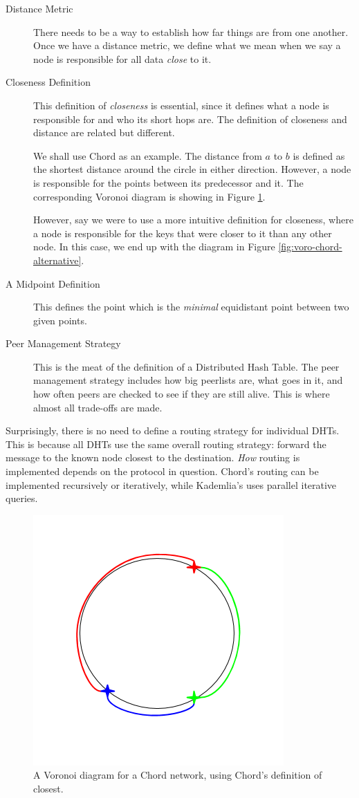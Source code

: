 \begin{description}
	\item [Distance Metric] There needs to be a way to establish how far things are from one another.
	Once we have a distance metric, we define what we mean when we say a node is responsible for all data \textit{close} to it.
	\item [Closeness Definition] This definition of \textit{closeness} is essential, since it defines what a node is responsible for and who its short hops are.
	The definition of closeness and distance are related but different.
	
	We shall use Chord \cite{chord}  as an example.  
	The distance from $ a $ to $ b $ is defined as the shortest distance around the circle in either direction.
	However, a node is responsible for the points between its predecessor and it.
	The corresponding Voronoi diagram is showing in Figure \ref{fig:voro-chord-normal}.
	
	
	However, say we were to use a more intuitive definition for closeness, where a node is responsible for the keys that were closer to it than any other node.
	In this case, we end up with the diagram in Figure \ref{fig:voro-chord-alternative}.
	\item [A Midpoint Definition] This defines the point which is the \textit{minimal} equidistant point between two given points.
	\item [Peer Management Strategy] This is the meat of the definition of a Distributed Hash Table.
	The peer management strategy includes how big peerlists are, what goes in it, and how often peers are checked to see if they are still alive.
	This is where almost all trade-offs are made.
\end{description}

Surprisingly, there is no need to define a routing strategy for individual DHTs. 
This is because all DHTs use the same overall routing strategy:  forward the message to the known node closest to the destination.
\textit{How} routing is implemented depends on the protocol in question.
Chord's routing can be implemented recursively or iteratively, while Kademlia's uses parallel iterative queries.

\begin{figure}
	\centering
	\includegraphics[width=0.5\linewidth]{figs/voro-chord-normal}
	\caption{A Voronoi diagram for a Chord network, using Chord's definition of closest.}
	\label{fig:voro-chord-normal}
\end{figure}

